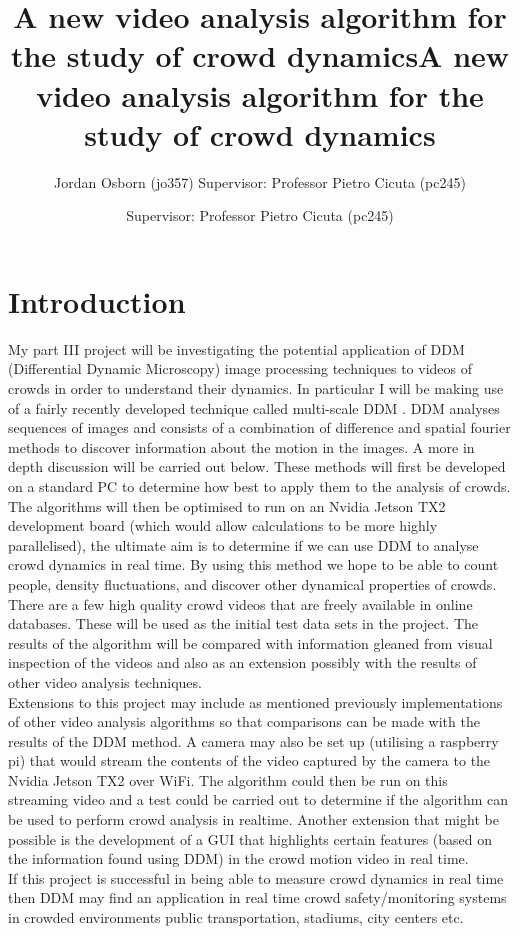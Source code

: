 \documentclass[11pt]{article}
\title{A new video analysis algorithm for the study of crowd dynamics}
\author{Jordan Osborn (jo357) Supervisor: Professor Pietro Cicuta (pc245)}
\begin{document}
\begin{titlingpage}
    \maketitle
\end{titlingpage}
\clearpage

\title{A new video analysis algorithm for the study of crowd dynamics}
\author{Supervisor: Professor Pietro Cicuta (pc245)}
\maketitle

\section{Introduction}
My part III project will be investigating the potential application of DDM (Differential Dynamic Microscopy) image processing techniques to videos of crowds in order to understand their dynamics.
In particular I will be making use of a fairly recently developed technique called multi-scale DDM .
DDM analyses sequences of images and consists of a combination of difference and spatial fourier methods to discover information about the motion in the images.
A more in depth discussion will be carried out below.
These methods will first be developed on a standard PC to determine how best to apply them to the analysis of crowds.
The algorithms will then be optimised to run on an Nvidia Jetson TX2 development board (which would allow calculations to be more highly parallelised), the ultimate aim is to determine if we can use DDM to analyse crowd dynamics in real time.
By using this method we hope to be able to count people, density fluctuations, and discover other dynamical properties of crowds.
There are a few high quality crowd videos that are freely available in online databases.\cite{crowdMotionDB}
These will be used as the initial test data sets in the project.
The results of the algorithm will be compared with information gleaned from visual inspection of the videos and also as an extension possibly with the results of other video analysis techniques.
\\
Extensions to this project may include as mentioned previously implementations of other video analysis algorithms so that comparisons can be made with the results of the DDM method.
A camera may also be set up (utilising a raspberry pi) that would stream the contents of the video captured by the camera to the Nvidia Jetson TX2 over WiFi.
The algorithm could then be run on this streaming video and a test could be carried out to determine if the algorithm can be used to perform crowd analysis in realtime.
Another extension that might be possible is the development of a GUI that highlights certain features (based on the information found using DDM) in the crowd motion video in real time.
\\
If this project is successful in being able to measure crowd dynamics in real time then DDM may find an application in real time crowd safety/monitoring systems in crowded environments public transportation, stadiums, city centers etc.
\end{document}
